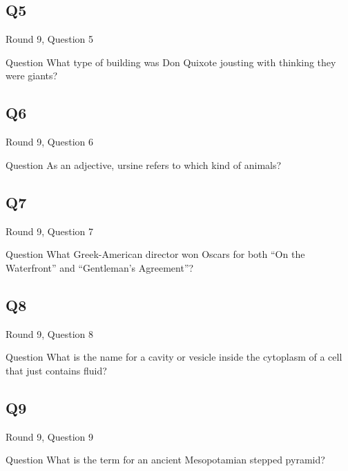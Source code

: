 \documentclass[11pt]{beamer}
\begin{document}
\subsection*{Q5}
\begin{frame}[t]{Round 9, Question 5}
\vspace{2em}
\begin{block}{Question}
What type of building was Don Quixote jousting with thinking they were giants\@?
\end{block}
\end{frame}
    

\subsection*{Q6}
\begin{frame}[t]{Round 9, Question 6}
\vspace{2em}
\begin{block}{Question}
As an adjective, ursine refers to which kind of animals\@?
\end{block}
\end{frame}
    

\subsection*{Q7}
\begin{frame}[t]{Round 9, Question 7}
\vspace{2em}
\begin{block}{Question}
What Greek-American director won Oscars for both ``On the Waterfront'' and ``Gentleman's Agreement''\@?
\end{block}
\end{frame}
    

\subsection*{Q8}
\begin{frame}[t]{Round 9, Question 8}
\vspace{2em}
\begin{block}{Question}
What is the name for a cavity or vesicle inside the cytoplasm of a cell that just contains fluid\@?
\end{block}
\end{frame}
    

\subsection*{Q9}
\begin{frame}[t]{Round 9, Question 9}
\vspace{2em}
\begin{block}{Question}
What is the term for an ancient Mesopotamian stepped pyramid\@?
\end{block}
\end{frame}
    
\end{document}
